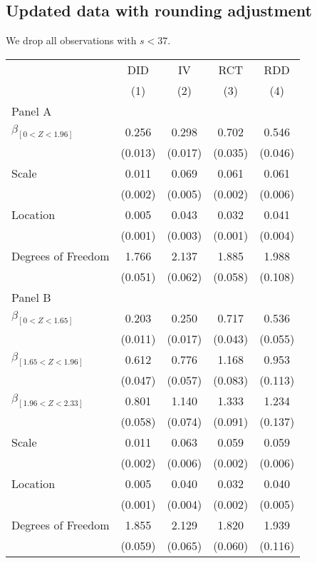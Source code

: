 \documentclass[
]{article}
\begin{document}
\hypertarget{updated-data-with-rounding-adjustment-1}{%
\subsection{Updated data with rounding
adjustment}\label{updated-data-with-rounding-adjustment-1}}

We drop all observations with \(s < 37\).

\def\sym#1{\ifmmode^{#1}\else\(^{#1}\)\fi} \begin{tabular}{l*{4}{c}} \hline\hline & \multicolumn{1}{c}{DID} &  \multicolumn{1}{c}{IV} &  \multicolumn{1}{c}{RCT} &  \multicolumn{1}{c}{RDD}\\  & \multicolumn{1}{c}{(1)} &  \multicolumn{1}{c}{(2)} &  \multicolumn{1}{c}{(3)} &  \multicolumn{1}{c}{(4)}\\  \hline \hline  Panel A \\  $\beta_{[0 < Z < 1.96]}$ & 0.256 &  0.298 &  0.702 &  0.546\\ & (0.013) &  (0.017) &  (0.035) &  (0.046)\\  Scale & 0.011 &  0.069 &  0.061 &  0.061\\ & (0.002) &  (0.005) &  (0.002) &  (0.006) \\  Location & 0.005 &  0.043 &  0.032 &  0.041\\ & (0.001) &  (0.003) &  (0.001) &  (0.004) \\  Degrees of Freedom & 1.766 &  2.137 &  1.885 &  1.988\\ & (0.051) &  (0.062) &  (0.058) &  (0.108)\\ Panel B \\  $\beta_{[0 < Z < 1.65]}$ & 0.203 &  0.250 &  0.717 &  0.536\\ & (0.011) &  (0.017) &  (0.043) &  (0.055)\\  $\beta_{[1.65 < Z < 1.96]}$ & 0.612 &  0.776 &  1.168 &  0.953\\ & (0.047) &  (0.057) &  (0.083) &  (0.113)\\   $\beta_{[1.96 < Z < 2.33]}$ & 0.801 &  1.140 &  1.333 &  1.234\\ & (0.058) &  (0.074) &  (0.091) &  (0.137)\\  Scale & 0.011 &  0.063 &  0.059 &  0.059\\ & (0.002) &  (0.006) &  (0.002) &  (0.006) \\  Location & 0.005 &  0.040 &  0.032 &  0.040\\ & (0.001) &  (0.004) &  (0.002) &  (0.005) \\  Degrees of Freedom & 1.855 &  2.129 &  1.820 &  1.939\\ & (0.059) &  (0.065) &  (0.060) &  (0.116)\\  \hline\hline \end{tabular}
\end{document}
